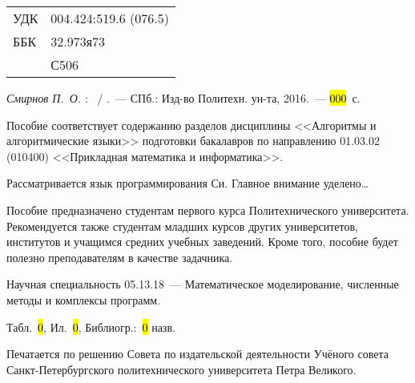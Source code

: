 


\noindent
\begin{tabular}{ll}
УДК & 004.424:519.6 (076.5)\\
ББК & 32.973я73\\
    & С506 \\
\end{tabular}

\vskip1cm

\textit{Смирнов П.~О.} \textbf{\@title}: \MakeLowercase{\@subtitle}~/ \@author.~---
СПб.: Изд-во Политехн. ун-та, 2016.~--- \hl{000}~с.
\vskip1cm

Пособие соответствует 
содержанию разделов дисциплины <<Алгоритмы и алгоритмические языки>>
подготовки бакалавров по направлению 01.03.02 (010400) <<Прикладная математика
и информатика>>.

Рассматривается язык программирования Си. Главное внимание уделено\dots

Пособие предназначено студентам первого курса Политехнического университета.
Рекомендуется также студентам младших курсов других университетов, институтов
и учащимся средних учебных заведений. Кроме того, пособие будет полезно
преподавателям в качестве задачника.

Научная специальность 05.13.18~--- Математическое моделирование, численные
методы и комплексы программ.

\vskip1cm

Табл.~\hl{0}, Ил.~\hl{0}, Библиогр.:~\hl{0} назв.

\vskip1cm

Печатается по решению Совета по издательской деятельности Учёного совета
Санкт-Петербургского политехнического университета Петра Великого.

